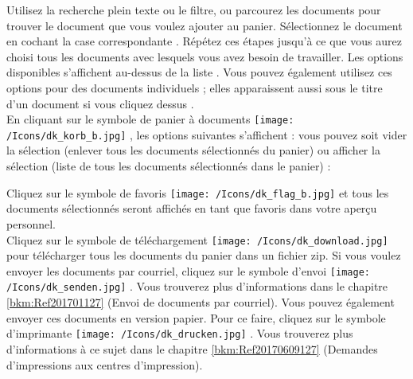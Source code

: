 Utilisez la recherche plein texte ou le filtre, ou parcourez les documents pour trouver le document que vous voulez ajouter au panier. Sélectionnez le document en cochant la case correspondante . Répétez ces étapes jusqu'à ce que vous aurez choisi tous les documents avec lesquels vous avez besoin de travailler. Les options disponibles s'affichent au-dessus de la liste . Vous pouvez également utilisez ces options pour des documents individuels ; elles apparaissent aussi sous le titre d'un document si vous cliquez dessus . \\
En cliquant sur le symbole de panier à documents \texttt{[image: /Icons/dk\_korb\_b.jpg]} , les options suivantes s'affichent : vous pouvez soit vider la sélection (enlever tous les documents sélectionnés du panier)  ou afficher la sélection (liste de tous les documents sélectionnés dans le panier)  :
\begin{figure}[H]
\end{figure}
 
Cliquez sur le symbole de favoris \texttt{[image: /Icons/dk\_flag\_b.jpg]}  et tous les documents sélectionnés seront affichés en tant que favoris dans votre aperçu personnel. \\
Cliquez sur le symbole de téléchargement \texttt{[image: /Icons/dk\_download.jpg]}  pour télécharger tous les documents du panier dans un fichier zip. Si vous voulez envoyer les documents par courriel, cliquez sur le symbole d'envoi \texttt{[image: /Icons/dk\_senden.jpg]} . Vous trouverez plus d'informations dans le chapitre \ref{bkm:Ref201701127} (Envoi de documents par courriel). Vous pouvez également envoyer ces documents en version papier. Pour ce faire, cliquez sur le symbole d'imprimante \texttt{[image: /Icons/dk\_drucken.jpg]} . Vous trouverez plus d'informations à ce sujet dans le chapitre \ref{bkm:Ref20170609127} (Demandes d'impressions aux centres d'impression).

\vspace{\baselineskip}

